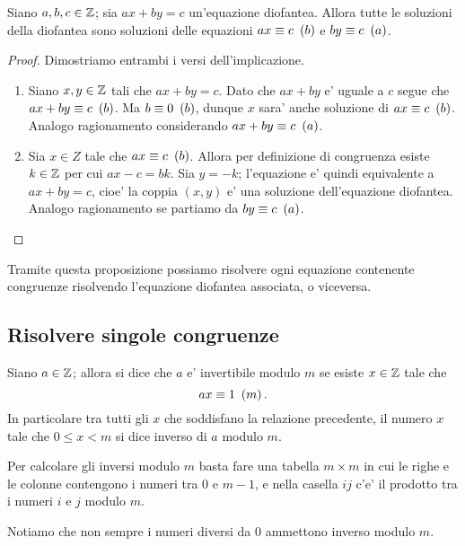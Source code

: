 \begin{proposition}
    Siano $a, b, c \in \mathbb{Z}$; sia $ax + by = c$ un'equazione diofantea. Allora tutte le soluzioni della diofantea sono soluzioni delle equazioni $ax \equiv c \ \left(b\right)$ e $by \equiv c \ \left(a\right)$.
\end{proposition}
\begin{proof}
    Dimostriamo entrambi i versi dell'implicazione.
    \begin{enumerate}
        \item Siano $x, y \in \mathbb{Z}$ tali che $ax + by = c$. Dato che $ax + by$ e' uguale a $c$ segue che $ax + by \equiv c \ \left(b\right)$. Ma $b \equiv 0 \ \left(b\right)$, dunque $x$ sara' anche soluzione di $ax \equiv c \ \left(b\right)$. Analogo ragionamento considerando $ax + by \equiv c \ \left(a\right)$.
        \item Sia $x \in Z$ tale che $ax \equiv c \ \left(b\right)$. Allora per definizione di congruenza esiste $k \in \mathbb{Z}$ per cui $ax - c = bk$. Sia $y = -k$; l'equazione e' quindi equivalente a $ax + by = c$, cioe' la coppia $(x, y)$ e' una soluzione dell'equazione diofantea. Analogo ragionamento se partiamo da $by \equiv c \ \left(a\right)$.
    \end{enumerate}
\end{proof}

Tramite questa proposizione possiamo risolvere ogni equazione contenente congruenze risolvendo l'equazione diofantea associata, o viceversa.


\subsection{Risolvere singole congruenze}

\begin{definition}
    Siano $a \in \mathbb{Z}$; allora si dice che $a$ e' invertibile modulo $m$ se esiste  $x \in \mathbb{Z}$ tale che \[
        ax \equiv 1 \ \left(m\right)
    .\]
    In particolare tra tutti gli $x$ che soddisfano la relazione precedente, il numero $x$ tale che $0 \leq x < m$ si dice inverso di $a$ modulo $m$.
\end{definition}
Per calcolare gli inversi modulo $m$ basta fare una tabella $m \times m$ in cui le righe e le colonne contengono i numeri tra $0$ e $m-1$, e nella casella $ij$ c'e' il prodotto tra i numeri $i$ e $j$ modulo $m$.

Notiamo che non sempre i numeri diversi da $0$ ammettono inverso modulo $m$.

